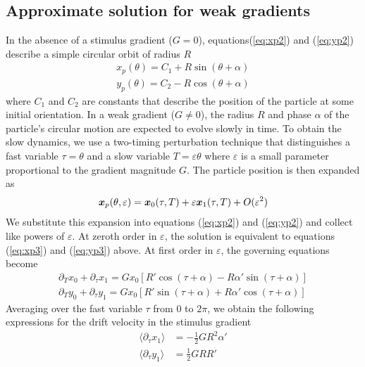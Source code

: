 \begin{appendices}
\subsection{Approximate solution for weak gradients}

In the absence of a stimulus gradient ($G=0$), equations(\ref{eq:xp2}) and (\ref{eq:yp2}) describe a simple circular orbit of radius $R$
\begin{align}
    x_p(\theta) = C_1 + R \sin(\theta + \alpha) \label{eq:xp3} 
    \\
    y_p(\theta) = C_2 - R \cos(\theta + \alpha)\label{eq:yp3} 
\end{align}
where $C_1$ and $C_2$ are constants that describe the position of the particle at some initial orientation.  In a weak gradient ($G\neq 0$), the radius $R$ and phase $\alpha$ of the particle's circular motion are expected to evolve slowly in time.  To obtain the slow dynamics, we use a two-timing perturbation technique\autocite{Strogatz2015} that distinguishes a fast variable $\tau=\theta$ and a slow variable $T=\varepsilon \theta$ where $\varepsilon$ is a small parameter proportional to the gradient magnitude $G$. The particle position is then expanded as
\begin{equation}
    \boldsymbol{x}_p(\theta,\varepsilon) = \boldsymbol{x}_0(\tau,T) + \varepsilon \boldsymbol{x}_1(\tau,T) + O(\varepsilon^2)
\end{equation}
We substitute this expansion into equations (\ref{eq:xp2}) and (\ref{eq:yp2}) and collect like powers of $\varepsilon$. At zeroth order in $\varepsilon$, the solution is equivalent to equations (\ref{eq:xp3}) and (\ref{eq:yp3}) above. At first order in $\varepsilon$, the governing equations become
\begin{align}
    \partial_T x_0 + \partial_{\tau} x_1 = G x_0 \left[ R' \cos(\tau + \alpha) - R \alpha' \sin(\tau + \alpha)\right] \label{eq:xp4} 
    \\
    \partial_T y_0 + \partial_{\tau} y_1 = G x_0 \left[ R' \sin(\tau + \alpha) + R \alpha' \cos(\tau + \alpha)\right] \label{eq:yp4}
\end{align}
Averaging over the fast variable $\tau$ from 0 to $2\pi$, we obtain the following expressions for the drift velocity in the stimulus gradient    
\begin{align}
    \langle \partial_{\tau} x_1 \rangle &=  - \tfrac{1}{2} G R^2\alpha' \label{eq:drift}
    \\
    \langle \partial_{\tau} y_1 \rangle &= \tfrac{1}{2} G R R' \label{eq:drift2}

\end{align}
\end{appendices}
